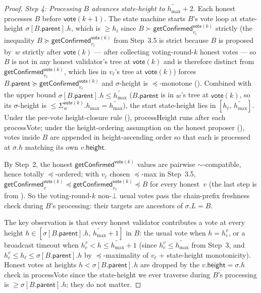 \ifx\litemode\undefined\documentclass{article}\fi
\newcommand{\height}{\mathsf{height}}
\newcommand{\parent}{\mathsf{parent}}
\newcommand{\hmax}{\ensuremath{h_{\max}}\xspace}
\newcommand{\processHeight}{\textsf{processHeight}\xspace}
\newcommand{\processVote}{\textsf{processVote}\xspace}
\newcommand{\vote}{\ensuremath{\mathsf{vote}}}
\newcommand{\comm}[1]{\ensuremath{\widetilde{#1}}}
\newcommand{\getConfirmed}{\textsf{getConfirmed}\xspace}
\theoremstyle{plain}
\theoremstyle{definition}
\theoremstyle{remark}
\begin{document}
\begin{proof}
\emph{Step 4: Processing $B$ advances state-height to $\comm{\hmax}+2$.}
Each honest processes $B$ before $\vote(k+1)$. The state machine starts $B$'s vote loop at state-height $\sigma[B.\parent].h$, which is $\geq h_\ell$ since $B \succ \getConfirmed_{v_\ell}^{\vote(k)}$ strictly (the inequality $B \succeq \getConfirmed_{v_\ell}^{\vote(k)}$ from Step~3.5 is strict because $B$ is proposed by~$w$ strictly after $\vote(k)$ --- after collecting voting-round-$k$ honest votes --- so $B$ is not in any honest validator's tree at $\vote(k)$ and is therefore distinct from $\getConfirmed_{v_\ell}^{\vote(k)}$, which lies in $v_\ell$'s tree at $\vote(k)$) forces $B.\parent \succeq \getConfirmed_{v_\ell}^{\vote(k)}$ and $\sigma$-height is $\preceq$-monotone (). Combined with the upper bound $\sigma[B.\parent].h \leq \comm{\hmax}$ ($B.\parent$ is in $w$'s tree at $\vote(k)$, so its $\sigma$-height is $\leq \Sigma_w^{\vote(k)}.\hmax = \comm{\hmax}$), the start state-height lies in $[h_\ell,\, \comm{\hmax}]$. Under the per-vote height-closure rule (), \processHeight{} runs after each \processVote{}; under the height-ordering assumption on the honest proposer (), votes inside $B$ are appended in height-ascending order so that each is processed at $\sigma.h$ matching its own $v.\height$.

By Step~2, the honest $\getConfirmed^{\vote(k)}$ values are pairwise $\sim$-compatible, hence totally $\preceq$-ordered; with $v_\ell$ chosen $\preceq$-max in Step~3.5, $\getConfirmed_v^{\vote(k)} \preceq \getConfirmed_{v_\ell}^{\vote(k)} \preceq B$ for every honest~$v$ (the last step is from ). So the voting-round-$k$ non-$\bot$ usual votes pass the chain-prefix freshness check during $B$'s processing: their targets are ancestors of $\sigma.L = B$.

The key observation is that every honest validator contributes a vote at every height $h \in [\sigma[B.\parent].h,\, \comm{\hmax}+1]$ in $B$: the usual vote when $h = h_c^v$, or a broadcast timeout when $h_c^v < h \leq \comm{\hmax}+1$ (since $h_c^v \leq \comm{\hmax}$ from Step~3, and $h_c^v \leq h_\ell \leq \sigma[B.\parent].h$ by $\preceq$-maximality of $v_\ell$ + state-height monotonicity). Honest votes at heights $h < \sigma[B.\parent].h$ are dropped by the $v.\height = \sigma.h$ check in \processVote{} since the state-height we ever traverse during $B$'s processing is $\geq \sigma[B.\parent].h$; they do not matter.


\end{proof}
\end{document}
